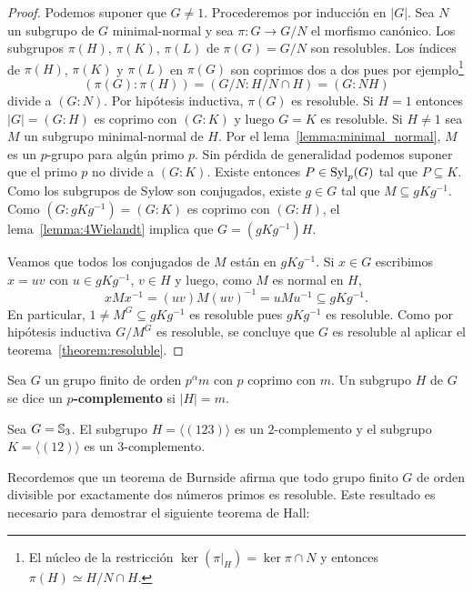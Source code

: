 
\begin{proof}
	Podemos suponer que $G\ne1$. Procederemos por inducción en $|G|$. Sea $N$
	un subgrupo de $G$ minimal-normal y sea $\pi\colon G\to G/N$ el morfismo
	canónico.  Los subgrupos $\pi(H)$, $\pi(K)$, $\pi(L)$ de $\pi(G)=G/N$ son
	resolubles. Los índices de $\pi(H)$, $\pi(K)$ y $\pi(L)$ en $\pi(G)$ son
	coprimos dos a dos pues por ejemplo\footnote{El núcleo de la restricción
	$\ker(\pi|_H)=\ker \pi\cap N$ y entonces $\pi(H)\simeq H/N\cap H$.}
	\[
	(\pi(G):\pi(H))=(G/N:H/N\cap H)=(G:NH)
	\]
	divide a $(G:N)$. Por hipótesis inductiva, $\pi(G)$ es resoluble. Si $H=1$
	entonces $|G|=(G:H)$ es coprimo con $(G:K)$ y luego $G=K$ es resoluble. Si
	$H\ne 1$ sea $M$ un subgrupo minimal-normal de $H$. Por el
	lema~\ref{lemma:minimal_normal}, $M$ es un $p$-grupo para algún primo $p$.
	Sin pérdida de generalidad podemos suponer que el primo $p$ no divide a
	$(G:K)$. Existe entonces $P\in\mathrm{Syl}_p(G)$ tal que $P\subseteq K$. Como los
	subgrupos de Sylow son conjugados, existe $g\in G$ tal que $M\subseteq
	gKg^{-1}$. Como $(G:gKg^{-1})=(G:K)$ es coprimo con $(G:H)$, el
	lema~\ref{lemma:4Wielandt} implica que $G=(gKg^{-1})H$. 
	
	Veamos que todos los conjugados de $M$ están en $gKg^{-1}$. 
	Si $x\in G$ escribimos $x=uv$ con $u\in 
	gKg^{-1}$, $v\in H$ y luego, como $M$ es normal en $H$, 
	\[
	xMx^{-1}=(uv)M(uv)^{-1}=uMu^{-1}\subseteq gKg^{-1}.
	\]
	En particular, $1\ne M^G\subseteq gKg^{-1}$ es resoluble pues $gKg^{-1}$ es
	resoluble. Como por hipótesis inductiva $G/M^G$ es resoluble, se concluye
	que $G$ es resoluble al aplicar el teorema~\ref{theorem:resoluble}.
\end{proof}

\begin{definition}
	Sea $G$ un grupo finito de orden $p^{\alpha}m$ con $p$ coprimo con $m$. Un
	subgrupo $H$ de $G$ se dice un \textbf{$p$-complemento} si $|H|=m$. 
\end{definition}

\begin{example}
	Sea $G=\mathbb{S}_3$. El subgrupo $H=\langle (123)\rangle$ es un $2$-complemento
	y el subgrupo $K=\langle (12)\rangle$ es un $3$-complemento.
\end{example}

Recordemos que un teorema de Burnside afirma que todo grupo finito $G$ de orden
divisible por exactamente dos números primos es resoluble. Este resultado es
necesario para demostrar el siguiente teorema de Hall:

